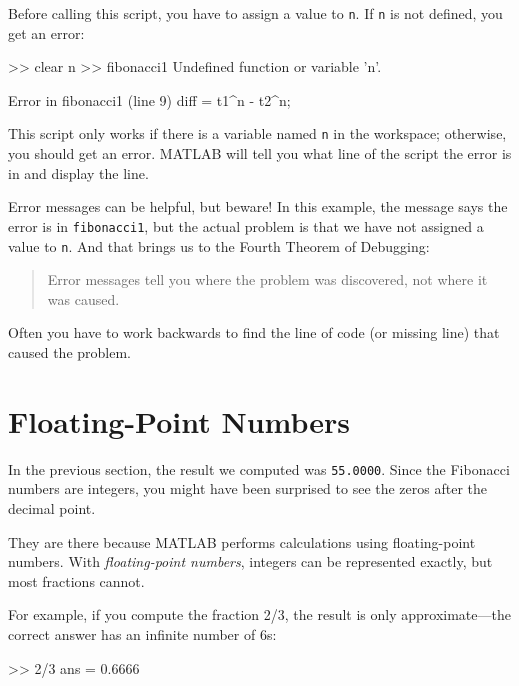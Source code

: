 Before calling this script, you have to assign a value to \lstinline{n}.
If \lstinline{n} is not defined, you get an error:

\begin{code}
>> clear n
>> fibonacci1
Undefined function or variable 'n'.

Error in fibonacci1 (line 9)
diff = t1^n - t2^n;
\end{code}

This script only works if there is a variable named \lstinline{n} in the workspace; otherwise, you should get an error.
MATLAB will tell you what line of the script the error is in and display the line.



Error messages can be helpful, but beware!
In this example, the message says the error is in \lstinline{fibonacci1}, but the actual problem is that we have not assigned a value to \lstinline{n}.
And that brings us to the Fourth Theorem of Debugging:

\begin{quote}
Error messages tell you where the problem was discovered,
not where it was caused.
\end{quote}

Often you have to work backwards to find the line of code (or missing line) that caused the problem.

\section{Floating-Point Numbers}

In the previous section, the result we computed was \lstinline{55.0000}.  Since the Fibonacci numbers are integers, you might have been surprised to see the zeros after the decimal point.

They are there because MATLAB performs calculations using floating-point numbers.  With \emph{floating-point numbers}, integers can be represented exactly, but most fractions cannot.


For example, if you compute the fraction 2/3, the result is only approximate---the correct answer has an infinite number of 6s:

\begin{code}
>> 2/3
ans = 0.6666
\end{code}



